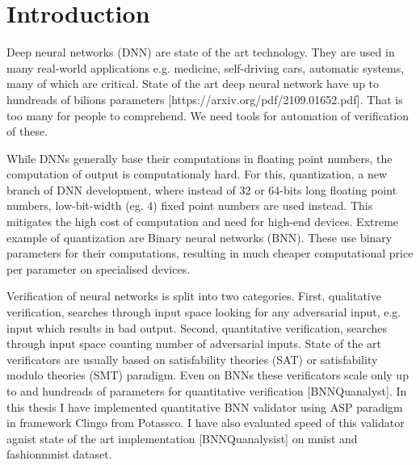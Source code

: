 \documentclass{fithesis}
\begin{document}
\chapter{Introduction}


Deep neural networks (DNN) are state of the art technology. They are used in many
real-world applications e.g. medicine, self-driving cars, automatic systems,
many of which are critical. %
State of the art deep neural network have up to hundreads of bilions
parameters [https://arxiv.org/pdf/2109.01652.pdf].
That is too many for people to comprehend. We need tools for automation
of verification of these.

While DNNs generally base their computations in floating point numbers,
the computation of output is computationaly hard. For this, quantization,
a new branch of DNN development, where instead of 32 or 64-bits long floating
point numbers, low-bit-width (eg. 4) fixed point numbers are used instead.
This mitigates the high cost of computation and need for high-end devices.
Extreme example of quantization are Binary neural networks (BNN).
These use binary parameters for their computations, resulting in much
cheaper computational price per parameter on specialised devices.

Verification of neural networks is split into two categories. First,
qualitative verification, searches through input space looking for any
adversarial input, e.g. input which results in bad output.
Second, quantitative verification, searches through input space
counting number of adversarial inputs.
State of the art verificators are usually based on satisfability
theories (SAT) or satisfability modulo theories (SMT) paradigm.
Even on BNNs these verificators scale only up to %
and hundreads of parameters for quantitative verification [BNNQuanalyst].
In this thesis I have implemented quantitative BNN validator using ASP paradigm
in framework Clingo from Potassco. I have also evaluated speed of this
validator agnist state of the art implementation [BNNQuanalysist] on mnist
and fashionmnist dataset.
\end{document}
